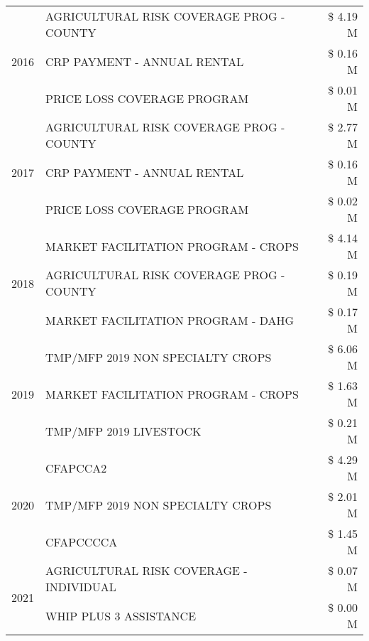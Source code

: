 \begin{tabular}{llr}
\multirow[t]{3}{*}{2016} & AGRICULTURAL RISK COVERAGE PROG - COUNTY      & \$ 4.19 M \\
 & CRP PAYMENT - ANNUAL RENTAL                   & \$ 0.16 M \\
 & PRICE LOSS COVERAGE PROGRAM                   & \$ 0.01 M \\
\cline{1-3}
\multirow[t]{3}{*}{2017} & AGRICULTURAL RISK COVERAGE PROG - COUNTY & \$ 2.77 M \\
 & CRP PAYMENT - ANNUAL RENTAL & \$ 0.16 M \\
 & PRICE LOSS COVERAGE PROGRAM & \$ 0.02 M \\
\cline{1-3}
\multirow[t]{3}{*}{2018} & MARKET FACILITATION PROGRAM - CROPS & \$ 4.14 M \\
 & AGRICULTURAL RISK COVERAGE PROG - COUNTY & \$ 0.19 M \\
 & MARKET FACILITATION PROGRAM - DAHG & \$ 0.17 M \\
\cline{1-3}
\multirow[t]{3}{*}{2019} & TMP/MFP 2019 NON SPECIALTY CROPS & \$ 6.06 M \\
 & MARKET FACILITATION PROGRAM - CROPS & \$ 1.63 M \\
 & TMP/MFP 2019 LIVESTOCK & \$ 0.21 M \\
\cline{1-3}
\multirow[t]{3}{*}{2020} & CFAPCCA2 & \$ 4.29 M \\
 & TMP/MFP 2019 NON SPECIALTY CROPS & \$ 2.01 M \\
 & CFAPCCCCA & \$ 1.45 M \\
\cline{1-3}
\multirow[t]{2}{*}{2021} & AGRICULTURAL RISK COVERAGE - INDIVIDUAL & \$ 0.07 M \\
 & WHIP PLUS 3 ASSISTANCE & \$ 0.00 M \\
\cline{1-3}
\bottomrule
\end{tabular}

